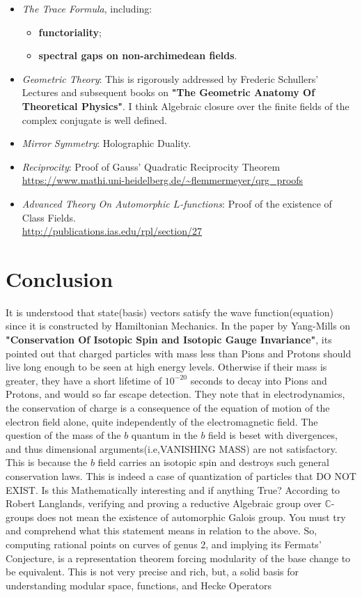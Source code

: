 \documentclass[11pt,fancy]{elegantbook}
\begin{document}
\begin{itemize}
\item \textit{The Trace Formula}, including:
   \begin{itemize}
      \item \textcolor{main}{\textbf{functoriality}};
      \item \textcolor{second}{\textbf{spectral gaps on non-archimedean fields}}.
   \end{itemize}
\item \textit{Geometric Theory}: This is rigorously addressed by Frederic Schullers' Lectures and subsequent books on \textbf{"The Geometric Anatomy Of Theoretical Physics"}. I think Algebraic closure over the finite fields of the complex conjugate is well defined.
\item \textit{Mirror Symmetry}: Holographic Duality.
\item \textit{Reciprocity}: Proof of Gauss' Quadratic Reciprocity Theorem\\
\url{https://www.mathi.uni-heidelberg.de/~flemmermeyer/qrg_proofs}
\item \textit{Advanced Theory On Automorphic $L$-functions}: Proof of the existence of Class Fields.\\
\url{http://publications.ias.edu/rpl/section/27}
\end{itemize}

\section{Conclusion}
\begin{remark}
It is understood that state(basis) vectors satisfy the wave function(equation) since it is constructed by Hamiltonian Mechanics. In the paper by Yang-Mills on \textbf{"Conservation Of Isotopic Spin and Isotopic Gauge Invariance"}, its pointed out that charged particles with mass less than Pions and Protons should live long enough to be seen at high energy levels. Otherwise if their mass is greater, they have a short lifetime of ${10^{-20}}$ seconds to decay into Pions and Protons, and would so far escape detection. They note that in electrodynamics, the conservation of charge is a consequence of the equation of motion of the electron field alone, quite independently of the electromagnetic field. 
The question of the mass of the $b$ quantum in the $b$ field is beset with divergences, and thus dimensional arguments(i.e,VANISHING MASS) are not satisfactory. This is because the $b$ field carries an isotopic spin and destroys such general conservation laws. This is indeed a case of quantization of particles that DO NOT EXIST. Is this Mathematically interesting and if anything True?
According to Robert Langlands, verifying and proving a reductive Algebraic group over ${\mathbb{C}}$-groups does not mean the existence of automorphic Galois group. You must try and comprehend what this statement means in relation to the above.
So, computing rational points on curves of genus 2, and implying its Fermats' Conjecture, is a representation theorem forcing modularity of the base change to be equivalent. This is not very precise and rich, but, a solid basis for understanding modular space, functions, and Hecke Operators
\end{remark}
\end{document}
